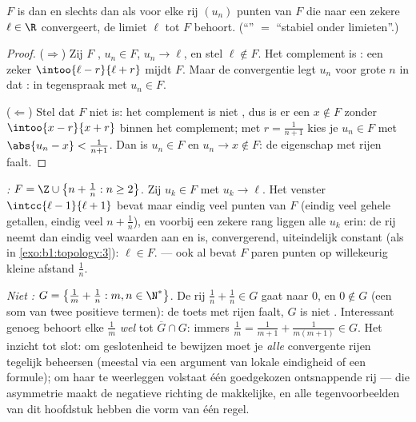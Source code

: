 \begin{theorem}\label{thm:b1:topology:seqclosed}
$F$ is  dan en slechts dan als voor elke rij $(u_n)$ punten van
$F$ die naar een zekere $\ell \in \R$ convergeert, de limiet $\ell$ tot
$F$ behoort. (``'' $=$ ``stabiel onder limieten''.)
\end{theorem}

\begin{proof}
($\Rightarrow$) Zij $F$ , $u_n \in F$, $u_n \to \ell$, en stel
$\ell \notin F$. Het complement is : een zeker $\intoo{\ell - r}{\ell
+ r}$ mijdt $F$. Maar de convergentie legt $u_n$ voor grote $n$ in dat
: in tegenspraak met $u_n \in F$.

($\Leftarrow$) Stel dat $F$ niet  is: het complement is niet
, dus is er een $x \notin F$ zonder  $\intoo{x - r}{x + r}$
binnen het complement; met $r = \frac{1}{n+1}$ kies je $u_n \in F$ met
$\abs{u_n - x} < \frac{1}{n+1}$. Dan is $u_n \in F$ en $u_n \to x \notin
F$: de eigenschap met rijen faalt.
\end{proof}

\begin{example}\label{ex:b1:topology:seqtest}
\emph{:} $F = \Z \cup \bigl\{n + \frac1n : n \geq 2\bigr\}$. Zij
$u_k \in F$ met $u_k \to \ell$. Het venster $\intcc{\ell - 1}{\ell + 1}$
bevat maar eindig veel punten van $F$ (eindig veel gehele getallen,
eindig veel $n + \frac1n$), en voorbij een zekere rang liggen alle $u_k$
erin: de rij neemt dan eindig veel waarden aan en is, convergerend,
uiteindelijk constant (als in \cref{exo:b1:topology:3}): $\ell \in F$.
 --- ook al bevat $F$ paren punten op willekeurig kleine afstand
$\frac1n$.

\emph{Niet :} $G = \bigl\{\frac1m + \frac1n : m, n \in
\N^*\bigr\}$. De rij $\frac1n + \frac1n \in G$ gaat naar $0$, en $0
\notin G$ (een som van twee positieve termen): de toets met rijen faalt,
$G$ is niet . Interessant genoeg behoort elke $\frac1m$ \emph{wel}
tot $\overline G \cap G$: immers $\frac1m = \frac{1}{m+1} +
\frac{1}{m(m+1)} \in G$. Het inzicht tot slot: om geslotenheid te
bewijzen moet je \emph{alle} convergente rijen tegelijk beheersen
(meestal via een argument van lokale eindigheid of een  formule);
om haar te weerleggen volstaat één goedgekozen ontsnappende rij --- die
asymmetrie maakt de negatieve richting de makkelijke, en alle
tegenvoorbeelden van dit hoofdstuk hebben die vorm van één regel.
\end{example}

